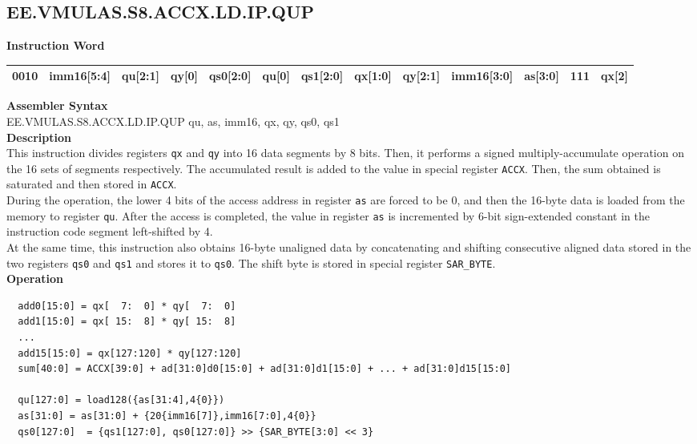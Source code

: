 \clearpage
\subsection{EE.VMULAS.S8.ACCX.LD.IP.QUP}\label{instruction:EEVMULASS8ACCXLDIPQUP}
\setlength\tabcolsep{5pt}
\textbf{Instruction Word} \\
\begin{tabular}{|c|c|c|c|c|c|c|c|c|c|c|c|c|}
	\hline
	0010 & imm16[5:4] & qu[2:1] & qy[0] & qs0[2:0] & qu[0] & qs1[2:0] & qx[1:0] & qy[2:1] & imm16[3:0] & as[3:0] & 111 & qx[2] \\
	\hline
\end{tabular}

\textbf{Assembler Syntax} \\
EE.VMULAS.S8.ACCX.LD.IP.QUP qu, as, imm16, qx, qy, qs0, qs1 \\
\textbf{Description} \\
This instruction divides registers \lstinline{qx} and \lstinline{qy} into 16 data segments by 8 bits. Then, it performs a signed multiply-accumulate operation on the 16 sets of segments respectively. The accumulated result is added to the value in special register \lstinline{ACCX}. Then, the sum obtained is saturated and then stored in \lstinline{ACCX}.\\
During the operation, the lower 4 bits of the access address in register \lstinline{as} are forced to be 0, and then the 16-byte data is loaded from the memory to register \lstinline{qu}. After the access is completed, the value in register \lstinline{as} is incremented by 6-bit sign-extended constant in the instruction code segment left-shifted by 4.\\
At the same time, this instruction also obtains 16-byte unaligned data by concatenating and shifting consecutive aligned data stored in the two registers \lstinline{qs0} and \lstinline{qs1} and stores it to \lstinline{qs0}. The shift byte is stored in special register \lstinline{SAR_BYTE}.\\
\textbf{Operation}
\begin{lstlisting}
  add0[15:0] = qx[  7:  0] * qy[  7:  0]
  add1[15:0] = qx[ 15:  8] * qy[ 15:  8]
  ...
  add15[15:0] = qx[127:120] * qy[127:120]
  sum[40:0] = ACCX[39:0] + ad[31:0]d0[15:0] + ad[31:0]d1[15:0] + ... + ad[31:0]d15[15:0]

  qu[127:0] = load128({as[31:4],4{0}})
  as[31:0] = as[31:0] + {20{imm16[7]},imm16[7:0],4{0}}
  qs0[127:0]  = {qs1[127:0], qs0[127:0]} >> {SAR_BYTE[3:0] << 3}
\end{lstlisting}

